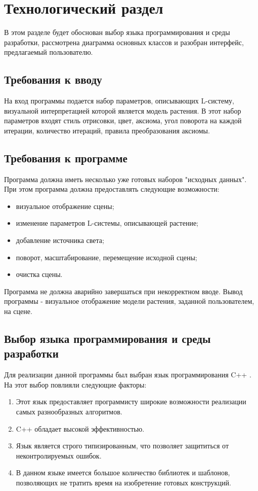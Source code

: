 \chapter{Технологический раздел}
В этом разделе будет обоснован выбор языка программирования и среды разработки, рассмотрена диаграмма основных классов и разобран интерфейс, предлагаемый пользователю.

\section{Требования к вводу} 
На вход программы подается набор параметров, описывающих L-систему, визуальной интерпретацией которой является модель растения. В этот набор параметров входят стиль отрисовки, цвет, аксиома, угол поворота на каждой итерации, количество итераций, правила преобразования аксиомы.

\section{Требования к программе} 
Программа должна иметь несколько уже готовых наборов "исходных данных". При этом программа должна предоставлять следующие возможности:
\begin{itemize}
	\item визуальное отображение сцены;
	\item изменение параметров L-системы, описывающей растение;
        \item добавление источника света;
	\item поворот, масштабирование, перемещение исходной сцены;
        \item очистка сцены.
\end{itemize}

Программа не должна аварийно завершаться при некорректном вводе.
Вывод программы - визуальное отображение модели растения, заданной пользователем, на сцене.

\section{Выбор языка программирования и среды разработки}
Для реализации данной программы был выбран язык программирования C++ \cite{Cpp}. На этот выбор повлияли следующие факторы:

\begin{enumerate}
	\item Этот язык предоставляет программисту широкие возможности реализации самых разнообразных алгоритмов. 
        \item C++ обладает высокой эффективностью.
	\item Язык является строго типизированным, что позволяет защититься от неконтролируемых  ошибок.
	\item В данном языке имеется большое количество библиотек и шаблонов, позволяющих не тратить время на изобретение готовых конструкций.
\end{enumerate}

